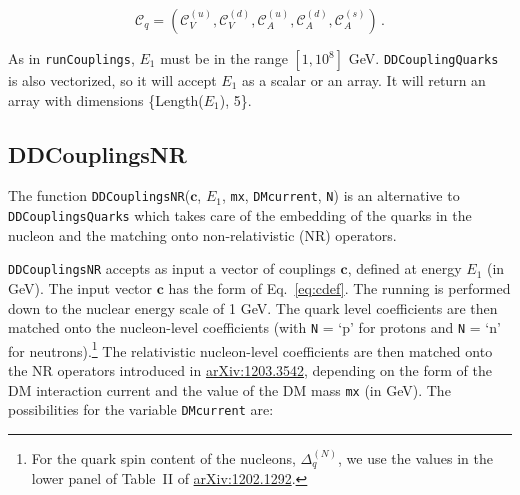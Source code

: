 \documentclass[notitlepage,12pt]{article}
\begin{document}
\begin{equation}
\mathcal{C}_q = \left( \mathcal{C}_V^{(u)}, \mathcal{C}_V^{(d)}, \mathcal{C}_A^{(u)}, \mathcal{C}_A^{(d)}, \mathcal{C}_A^{(s)} \right)\,.
\end{equation}

As in \texttt{runCouplings}, $E_1$ must be in the range $[1, 10^8]$ GeV. \texttt{DDCouplingQuarks} is also vectorized, so it will accept $E_1$ as a scalar or an array. It will return an array with dimensions \{Length($E_1$), 5\}.

\subsection{DDCouplingsNR}
\label{sec:DDCouplingsNR}

The function \texttt{DDCouplingsNR}($\mathbf{c}$, $E_1$, \texttt{mx}, \texttt{DMcurrent}, \texttt{N}) is an alternative to \texttt{DDCouplingsQuarks} which takes care of the embedding of the quarks in the nucleon and the matching onto non-relativistic (NR) operators. 

\texttt{DDCouplingsNR} accepts as input a vector of couplings $\mathbf{c}$, defined at energy $E_1$ (in GeV). The input vector $\mathbf{c}$ has the form of Eq.~\ref{eq:cdef}. The running is performed down to the nuclear energy scale of 1 GeV. The quark level coefficients are then matched onto the nucleon-level coefficients (with \texttt{N} = `p' for protons and \texttt{N} = `n' for neutrons).\footnote{For the quark spin content of the nucleons, $\Delta_q^{(N)}$, we use the values in the lower panel of Table~II of \href{http://arxiv.org/abs/1202.1292}{arXiv:1202.1292}.} The relativistic nucleon-level coefficients are then matched onto the NR operators introduced in \href{http://arxiv.org/abs/1203.3542}{arXiv:1203.3542}, depending on the form of the DM interaction current and the value of the DM mass \texttt{mx} (in GeV). The possibilities for the variable \texttt{DMcurrent} are:
\end{document}
